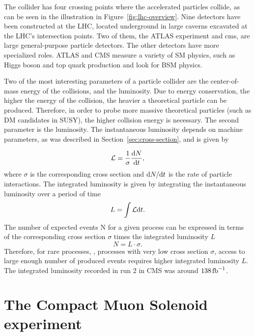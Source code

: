 The collider has four crossing points where the accelerated particles collide, as can be seen in the illustration in Figure~\ref{fig:lhc-overview}. Nine detectors have been constructed at the LHC, located underground in large caverns excavated at the LHC's intersection points. Two of them, the ATLAS experiment and \gls{cms}, are large general-purpose particle detectors. The other detectors have more specialized roles. ATLAS and CMS measure a variety of SM physics, such as Higgs boson and top quark production and look for BSM physics.

Two of the most interesting parameters of a particle collider are the center-of-mass energy of the collisions, and the luminosity. Due to energy conservation, the higher the energy of the collision, the heavier a theoretical particle can be produced. Therefore, in order to probe more massive theoretical particles (such as DM candidates in SUSY), the higher collision energy is necessary. The second parameter is the luminosity. The instantaneous luminosity depends on machine parameters, as was described in Section~\ref{sec:cross-section}, and is given by

\begin{equation}
\mathcal{L}=\frac{1}{\sigma} \dv{N}{t},
\end{equation}
where $\sigma$ is the corresponding cross section and $\mathrm{d} N/\mathrm{d} t$ is the rate of particle interactions. The integrated luminosity is given by integrating the instantaneous luminosity over a period of time
\begin{equation}
L=\int \mathcal{L} \dd t.
\end{equation}
The number of expected events N for a given process can be expressed in terms of the corresponding cross section $\sigma$ times the integrated luminosity $L$
\begin{equation}
N=L \cdot \sigma.
\end{equation}
Therefore, for rare processes, \ie, processes with very low cross section $\sigma$, access to large enough number of produced events requires higher integrated luminosity $L$. The integrated luminosity recorded in run 2 in CMS was around $138 \mbox{\ensuremath{\,\text{fb}^{-1}}}$.

\section{The Compact Muon Solenoid experiment}
\label{sec:cms}

